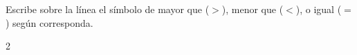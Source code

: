 Escribe sobre la línea el símbolo de mayor que ($>$), menor que ($<$), o igual ($=$) según corresponda.

		\begin{multicols}{2}
		\end{multicols}